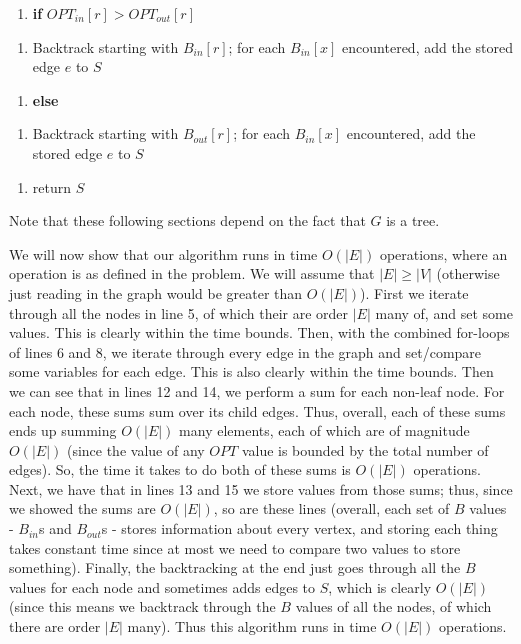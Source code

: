 \documentclass{article}
\newcommand{\modifyenum}[1]{%
  \end{enumerate}
  \begin{enumerate}[resume,#1]
}
\begin{document}
\begin{enumerate}
    \modifyenum{leftmargin=25pt}
    \item \textbf{if} $OPT_{in}[r] > OPT_{out}[r]$
    \modifyenum{leftmargin=50pt}
    \item Backtrack starting with $B_{in}[r]$; for
        each $B_{in}[x]$ encountered, add the stored edge $e$ to $S$
    \modifyenum{leftmargin=25pt}
    \item \textbf{else}
    \modifyenum{leftmargin=50pt}
    \item Backtrack starting with $B_{out}[r]$; for each $B_{in}[x]$ encountered,
        add the stored edge $e$ to $S$
    \modifyenum{leftmargin=25pt}
    \item return $S$
\end{enumerate}

\vspace{5mm}
Note that these following sections depend on the fact that $G$ is a tree.

We will now show that our algorithm runs in time $O(|E|)$ operations, where an
operation is as defined in the problem. We will assume that $|E| \geq |V|$
(otherwise just reading in the graph would be greater than $O(|E|)$).
First we iterate through all the nodes in line 5,
of which their are order $|E|$ many of, and set some values. This is clearly
within the time bounds. Then, with the combined for-loops of lines 6 and 8, we
iterate through every edge in the graph and set/compare some variables for each
edge. This is also clearly within the time bounds. Then we can see that in lines 12
and 14, we perform a sum for each non-leaf node. For each node, these sums sum
over its child edges. Thus, overall, each of these sums ends up summing $O(|E|)$
many elements, each of which are of magnitude $O(|E|)$ (since the value of any
$OPT$ value is bounded by the total number of edges). So, the time it takes to do
both of these sums is $O(|E|)$ operations. Next, we have that in lines 13 and 15
we store values from those sums; thus, since we showed the sums are $O(|E|)$, so
are these lines (overall, each set of $B$ values - $B_{in}$s and $B_{out}$s -
stores information about every vertex,
and storing each thing takes constant time since at most we need to compare two
values to store something). Finally, the backtracking at the end just goes through all the $B$ values for
each node and sometimes adds edges to $S$, which is clearly $O(|E|)$ (since this
means we backtrack through the $B$ values of all the nodes, of which there are
order $|E|$ many). Thus this algorithm
runs in time $O(|E|)$ operations.
\end{document}
